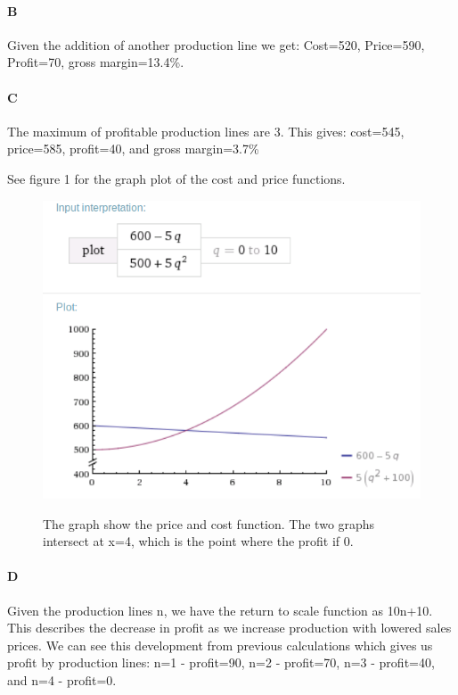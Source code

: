 \documentclass[12pt, a4paper]{article}
\begin{document}
\paragraph{B}
Given the addition of another production line we get: 
Cost=520, Price=590, Profit=70, gross margin=13.4\%.

\paragraph{C}
The maximum of profitable production lines are 3. 
This gives: cost=545, price=585, profit=40, and gross margin=3.7\%

See figure 1 for the graph plot of the cost and price functions. 

\begin{figure}[htb]
    \centering
    \includegraphics[width=\textwidth]{plot}
    \label{fig:plot}
    \caption{}
The graph show the price and cost function. The two graphs intersect at x=4,
which is the point where the profit if 0. 
\end{figure}

\paragraph{D}
Given the production lines n, we have the return to scale function as 10n+10.
This describes the decrease in profit as we increase production with lowered
sales prices. We can see this development from previous calculations which
gives us profit by production lines: n=1 - profit=90, n=2 - profit=70, n=3 -
profit=40, and n=4 - profit=0. 
\end{document}
